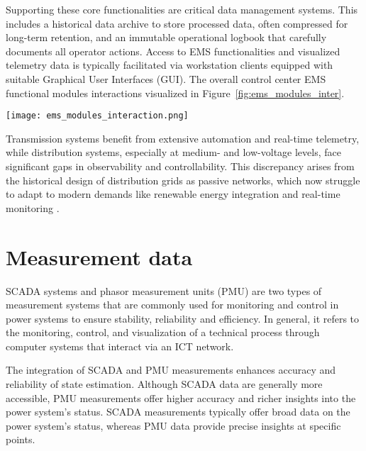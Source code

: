 
Supporting these core functionalities are critical data management systems. This includes a historical data archive to store processed data, often compressed for long-term retention, and an immutable operational logbook that carefully documents all operator actions.
Access to EMS functionalities and visualized telemetry data is typically facilitated via workstation clients equipped with suitable Graphical User Interfaces (GUI). The overall control center EMS functional modules interactions visualized in Figure~\cref{fig:ems_modules_inter}.

\begin{figure*}[htbp]
    \centering
    \texttt{[image: ems\_modules\_interaction.png]}
    \caption{Simplified EMS functional modules interaction  \autocite{8398846}.}
    \label{fig:ems_modules_inter}
\end{figure*}

Transmission systems benefit from extensive automation and real-time telemetry, while distribution systems, especially at medium- and low-voltage levels, face significant gaps in observability and controllability. This discrepancy arises from the historical design of distribution grids as passive networks, which now struggle to adapt to modern demands like renewable energy integration and real-time monitoring \autocite{8232008}.

\section{Measurement data}\label{sec:ch1/sec2}

SCADA systems and phasor measurement units (PMU) are two types of measurement systems that are commonly used for monitoring and control in power systems to ensure stability, reliability and efficiency. In general, it refers to the monitoring, control, and visualization of a technical process through computer systems that interact via an ICT network.


The integration of SCADA and PMU measurements enhances accuracy and reliability of state estimation. Although SCADA data are generally more accessible, PMU measurements offer higher accuracy and richer insights into the power system's status. SCADA measurements typically offer broad data on the power system's status, whereas PMU data provide precise insights at specific points. 

